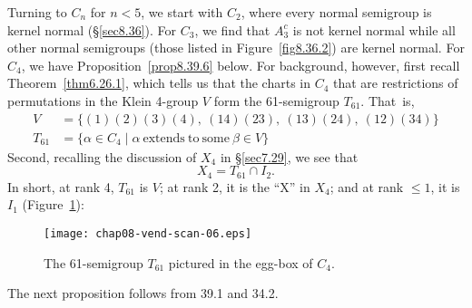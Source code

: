 \documentclass{surv-l}
\numberwithin{equation}{section}
\numberwithin{table}{section}
\numberwithin{figure}{section}
\theoremstyle{definition}
\begin{document}
Turning to $C_{n}$ for $n <5$, we start with $C_{2}$, where every
normal semigroup is kernel normal (\S\ref{sec8.36}). For $C_{3}$,
we find that $A_{3}^{c}$ is not kernel normal while all other
normal semigroups (those listed in Figure~\ref{fig8.36.2}) are
kernel normal. For $C_{4}$, we have Proposition~\ref{prop8.39.6}
below. For background, however, first recall
Theorem~\ref{thm6.26.1}, which tells us that the charts in $C_{4}$
that are restrictions of permutations in the Klein 4-group $V$
form the 61-semigroup $T_{61}$. That~is,
\begin{align*}
V&=\{(1)(2)(3)(4),\ (14)(23),\ (13)(24),\ (12)(34)\} \\
T_{61} &=\{\alpha\in C_{4}\mid \alpha\ \mathrm{extends\ to\ some}\ \beta\in V\}
\end{align*}
Second, recalling the discussion of $X_{4}$ in \S\ref{sec7.29}, we
see that
\[
X_{4}=T_{61}\cap I_{2}.
\]
In short, at rank 4, $T_{61}$ is $V$; at
rank 2, it is the ``X'' in $X_{4}$; and at rank $\leq
1$, it is $I_{1}$ (Figure~\ref{fig8.39.5}):

\setcounter{figure}{4}
\begin{figure}[!h]
\texttt{[image: chap08-vend-scan-06.eps]}
\caption{The 61-semigroup $T_{61}$ pictured in the egg-box of $C_{4}$.\label{fig8.39.5}}
\end{figure}

The next proposition follows from 39.1 and 34.2.
\end{document}
